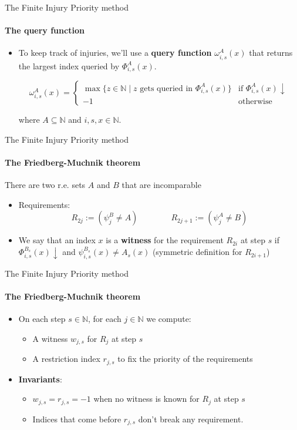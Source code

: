 \documentclass{beamer}
\newcommand{\N}{\mathbb{N}}
\begin{document}
\begin{frame}{The Finite Injury Priority method}
\framesubtitle{The query function}
    \begin{itemize}[<+->]
        \item To keep track of injuries, we'll use a \textbf{query function} $\omega_{i,s}^A(x)$ that returns the largest index queried by $\Phi_{i,s}^A(x)$.
        
        \[\omega_{i,s}^A(x) = \left \{ \begin{array}{ll}
            \max \{z \in \N \mid z \text{ gets queried in } \Phi_{i,s}^A(x)\} & \text{if } \Phi_{i,s}^A(x) \downarrow \\
            -1 & \text{otherwise}
        \end{array}\right .\]

        where $A  \subseteq \N$ and $i,s,x \in \N$.
    \end{itemize}

\end{frame}

\begin{frame}{The Finite Injury Priority method}
\framesubtitle{The Friedberg-Muchnik theorem}
    \begin{theorem}{\cite{friedberg,muchnik}}
        There are two r.e. sets $A$ and $B$ that are incomparable
    \end{theorem}
    \begin{itemize}[<+->]
        \item Requirements:
        \[R_{2j} := (\psi_j^B \neq A) \qquad\qquad R_{2j+1} := (\psi_j^A \neq B)\]
        \item We say that an index $x$ is a \textbf{witness} for the requirement $R_{2i}$ at step $s$ if $\Phi_{i,s}^{B_s}(x) \downarrow$ and $\psi_{i,s}^{B_s}(x) \neq A_s(x)$ (symmetric definition for $R_{2i+1}$)
    \end{itemize}
\end{frame}

\begin{frame}{The Finite Injury Priority method}
\framesubtitle{The Friedberg-Muchnik theorem}
    \begin{itemize}[<+->]
        \item On each step $s \in \N$, for each $j \in \N$ we compute:
        \begin{itemize}
            \item A witness $w_{j,s}$ for $R_j$ at step $s$
            \item A restriction index $r_{j,s}$ to fix the priority of the requirements
        \end{itemize}
        \item \textbf{Invariants}:
        \begin{itemize}
            \item $w_{j,s} = r_{j,s} = -1$ when no witness is known for $R_j$ at step $s$
            \item Indices that come before $r_{j,s}$ don't break any requirement.
        \end{itemize}
    \end{itemize}
\end{frame}
\end{document}
